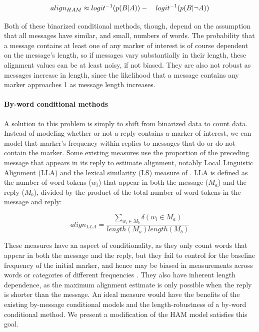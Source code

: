 \documentclass[11pt]{article}
\begin{document}
\begin{dmath}
align_{HAM} \approx logit^{-1}(p(B|A)) - \\ \hspace*{1em} logit^{-1}(p(B|\neg A))
\end{dmath}

Both of these binarized conditional methods, though, depend on the assumption that all messages have similar, and small, numbers of words. The probability that a message contains at least one of any marker of interest is of course dependent on the message's length, so if messages vary substantially in their length, these alignment values can be at least noisy, if not biased. They are also not robust as messages increase in length, since the likelihood that a message contains any marker approaches 1 as message length increases.

\paragraph{By-word conditional methods} A solution to this problem is simply to shift from binarized data to count data. Instead of modeling whether or not a reply contains a marker of interest, we can model that marker's frequency within replies to messages that do or do not contain the marker.  Some existing measures use the proportion of the preceding message that appears in its reply to estimate alignment, notably Local Linguistic Alignment (LLA) \cite{FusaroliEtAl2012,WangReitterYen2014} and the lexical similarity (LS) measure of \cite{HealeyPurverHowes2014}. LLA is defined as the number of word tokens ($w_i$) that appear in both the message ($M_a$) and the reply ($M_b$), divided by the product of the total number of word tokens in the message and reply:

\begin{equation}
align_{LLA} = \frac{\sum_{w_i \in M_b} \delta(w_i \in M_a)}{length(M_a)length(M_b)}
\end{equation}

These measures have an aspect of conditionality, as they only count words that appear in both the message and the reply, but they fail to control for the baseline frequency of the initial marker, and hence may be biased in measurements across words or categories of different frequencies \cite{DoyleYurovskyFrank2016}. They also have inherent length dependence, as the maximum alignment estimate is only possible when the reply is shorter than the message.
An ideal measure would have the benefits of the existing by-message conditional models and the length-robustness of a by-word conditional method. We present a modification of the HAM model satisfies this goal.
\end{document}
